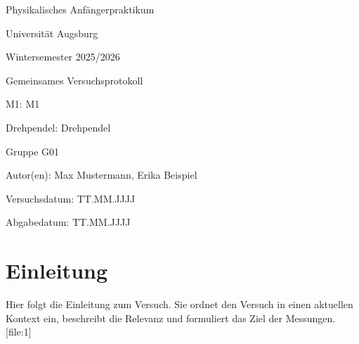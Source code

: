 \documentclass[11pt,a4paper]{article}
\numberwithin{equation}{section}
\newcommand{\Lehrveranstaltung}{Physikalisches Anfängerpraktikum}
\newcommand{\Universitaet}{Universität Augsburg}
\newcommand{\Semester}{Wintersemester 2025/2026}
\newcommand{\Versuchsnummer}{M1}
\newcommand{\Versuchstitel}{Drehpendel}
\newcommand{\Gruppe}{G01}
\newcommand{\Versuchsdatum}{TT.MM.JJJJ}
\newcommand{\Abgabedatum}{TT.MM.JJJJ}
\newcommand{\Abgabeart}{Gemeinsames Versuchsprotokoll}
\newcommand{\Autor}{Max Mustermann, Erika Beispiel}
\begin{document}

\begin{titlepage}
    \centering
    {\Large \Lehrveranstaltung\par}
    \vspace{0.5cm}
    {\large \Universitaet\par}
    \vspace{0.5cm}
    {\large \Semester\par}
    \vspace{1.5cm}
    {\LARGE \Abgabeart\par}
    \vspace{0.5cm}
    {\Large \Versuchsnummer: \Versuchsnummer\par}
    \vspace{0.5cm}
    {\Large \Versuchstitel: \Versuchstitel\par}
    \vspace{1.5cm}
    {\large Gruppe \Gruppe\par}
    \vspace{0.5cm}
    {\large Autor(en): \Autor\par}
    \vspace{1.5cm}
    {\large Versuchsdatum: \Versuchsdatum\par}
    \vspace{0.5cm}
    {\large Abgabedatum: \Abgabedatum\par}

    \vfill
\end{titlepage}


\section{Einleitung}

Hier folgt die Einleitung zum Versuch. Sie ordnet den Versuch in einen aktuellen Kontext ein, beschreibt die Relevanz und formuliert das Ziel der Messungen. [file:1]

\end{document}
